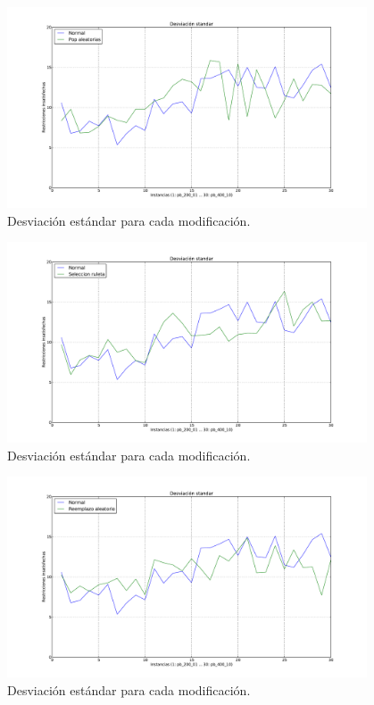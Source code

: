 \begin{figure}[H]
\begin{center}
\includegraphics[width=0.95\textwidth]{img/s-1.pdf}
\end{center}
\caption{Desviación estándar para cada modificación.}
\label{fig:s-1}
\end{figure}

\begin{figure}[H]
\begin{center}
\includegraphics[width=0.95\textwidth]{img/s-2.pdf}
\end{center}
\caption{Desviación estándar para cada modificación.}
\label{fig:s-2}
\end{figure}

\begin{figure}[H]
\begin{center}
\includegraphics[width=0.95\textwidth]{img/s-3.pdf}
\end{center}
\caption{Desviación estándar para cada modificación.}
\label{fig:s-3}
\end{figure}

